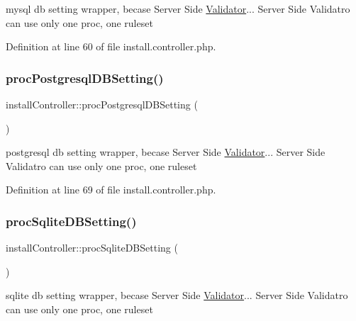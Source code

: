 mysql db setting wrapper, becase Server Side \hyperlink{classValidator}{Validator}... Server Side Validatro can use only one proc, one ruleset 



Definition at line 60 of file install.\+controller.\+php.

\mbox{\label{classinstallController_afc3f4c6259e4be427531fca748c98c49}} 
\subsubsection{\texorpdfstring{proc\+Postgresql\+D\+B\+Setting()}{procPostgresqlDBSetting()}}
{\footnotesize\ttfamily install\+Controller\+::proc\+Postgresql\+D\+B\+Setting (\begin{DoxyParamCaption}{ }\end{DoxyParamCaption})}



postgresql db setting wrapper, becase Server Side \hyperlink{classValidator}{Validator}... Server Side Validatro can use only one proc, one ruleset 



Definition at line 69 of file install.\+controller.\+php.

\mbox{\label{classinstallController_ad850902e30ecd8f0d80f82579f1f867f}} 
\subsubsection{\texorpdfstring{proc\+Sqlite\+D\+B\+Setting()}{procSqliteDBSetting()}}
{\footnotesize\ttfamily install\+Controller\+::proc\+Sqlite\+D\+B\+Setting (\begin{DoxyParamCaption}{ }\end{DoxyParamCaption})}



sqlite db setting wrapper, becase Server Side \hyperlink{classValidator}{Validator}... Server Side Validatro can use only one proc, one ruleset 



